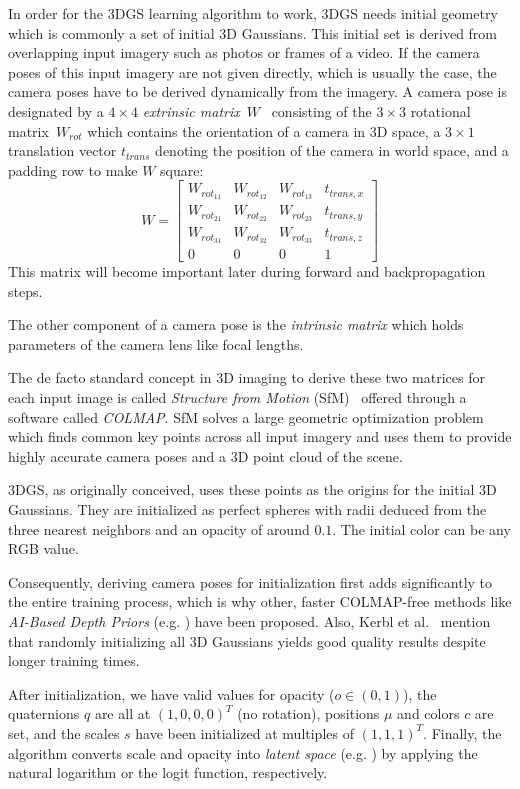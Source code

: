 In order for the 3DGS learning algorithm to work, 3DGS needs initial geometry which is commonly a set of initial 3D Gaussians. This initial set is derived from overlapping input imagery such as photos or frames of a video.
If the camera poses of this input imagery are not given directly, which is usually the case, the camera poses have to be derived dynamically from the imagery.
A camera pose is designated by a $4\times 4$ \textit{extrinsic matrix}~$W$~\cite{marschnerFundamentalsComputerGraphics2021} consisting of the $3\times 3$ rotational matrix~$W_{rot}$ which contains the orientation of a camera in 3D space, a $3\times 1$ translation vector $t_{trans}$ denoting the position of the camera in world space, and a padding row to make $W$ square:
$$
W=
\begin{bmatrix}
    W_{rot_{11}} & W_{rot_{12}} & W_{rot_{13}} & t_{trans,x} \\
    W_{rot_{21}} & W_{rot_{22}} & W_{rot_{23}} & t_{trans,y} \\
    W_{rot_{31}} & W_{rot_{32}} & W_{rot_{33}} & t_{trans,z} \\
    0 & 0 & 0 & 1
\end{bmatrix}
$$
This matrix will become important later during forward and backpropagation steps.

The other component of a camera pose is the \textit{intrinsic matrix} which holds parameters of the camera lens like focal lengths.

The de facto standard concept in 3D imaging to derive these two matrices for each input image is called \textit{Structure from Motion} (SfM)~\cite{ullmanInterpretationStructureMotion1979} offered through a software called \textit{COLMAP}. SfM solves a large geometric optimization problem which finds common key points across all input imagery and uses them to provide highly accurate camera poses and a 3D point cloud of the scene. 

3DGS, as originally conceived, uses these points as the origins for the initial 3D Gaussians. They are initialized as perfect spheres with radii deduced from the three nearest neighbors and an opacity of around $0.1$. The initial color can be any RGB value.

Consequently, deriving camera poses for initialization first adds significantly to the entire training process, which is why other, faster COLMAP-free methods like \textit{AI-Based Depth Priors} (e.g. \cite{wangDUSt3RGeometric3D2024}) have been proposed. Also, Kerbl et al.~\cite{kerbl3DGaussianSplatting2023} mention that randomly initializing all 3D Gaussians yields good quality results despite longer training times.

After initialization, we have valid values for opacity ($o \in (0,1)$), the quaternions $q$ are all at $(1,0,0,0)^T$ (no rotation), positions $\mu$ and colors $c$ are set, and the scales $s$ have been initialized at multiples of $(1,1,1)^T$. Finally, the algorithm converts scale and opacity into \textit{latent space} (e.g. \cite{bengioRepresentationLearningReview2013}) by applying the natural logarithm or the logit function, respectively.

